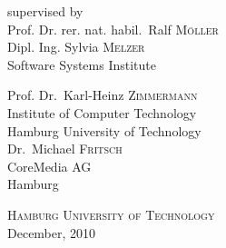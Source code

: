 \documentclass[12pt,a4paper]{extreport}
\begin{document}
\begin{titlepage}
\begin{minipage}[b]{1\linewidth}
\begin{flushleft}
supervised by\\
\medskip
\large
Prof. Dr. rer. nat. habil.~Ralf \textsc{M\"oller}\\
Dipl. Ing. Sylvia \textsc{Melzer}\\
\normalsize 
Software Systems Institute\\
\medskip

\large Prof. Dr.~Karl-Heinz \textsc{Zimmermann}\\
\normalsize Institute of Computer Technology\\
Hamburg University of Technology\\

\bigskip
\bigskip
\large
Dr.~Michael \textsc{Fritsch}\\
\normalsize 
CoreMedia AG\\
Hamburg\\



\end{flushleft}


\begin{center}
\bigskip
\large
\textsc{Hamburg University of Technology}\\
{\large December, 2010} 
\end{center} 

\end{minipage}

\end{titlepage}

%

{\renewcommand{\thepage}{}

%
}


\makeatletter
\renewcommand{\fnum@figure}{\textbf{Figure~\thefigure}}
\makeatother

\tableofcontents
{}
\listoffigures
\listoftables
\listofalgorithms
\lstlistoflistings








\printglossaries


\begin{appendix}


\end{appendix}

% 


\end{document}

